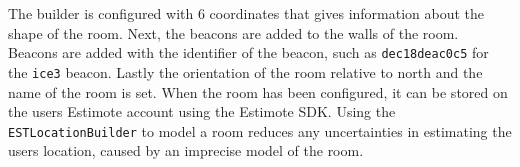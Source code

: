 The builder is configured with $6$ coordinates that gives information about the shape of the room. 
Next, the beacons are added to the walls of the room. 
Beacons are added with the identifier of the beacon, 
such as \texttt{dec18deac0c5} for the \texttt{ice3} beacon. 
Lastly the orientation of the room relative to north and the name of the room is set. 
When the room has been configured, 
it can be stored on the users Estimote account using the Estimote SDK.
Using the \texttt{ESTLocationBuilder} to model a room reduces any uncertainties in estimating the users location, 
caused by an imprecise model of the room.

